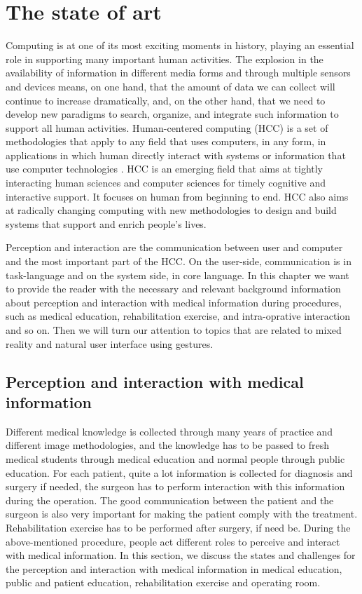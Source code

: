 
\chapter{The state of art} \label{sec:bg}
Computing is at one of its most exciting moments in history, playing an essential role in supporting many important human activities. The explosion in the availability of information in different media forms and through multiple sensors and devices means, on one hand, that the amount of data we can collect will continue to increase dramatically, and, on the other hand, that we need to develop new paradigms to search, organize, and integrate such information to support all human activities.
Human-centered computing (HCC) is a set of methodologies that apply to any field that uses computers, in any form, in applications in which human directly interact with systems or information that use computer technologies \cite{Jaimes2006f}.
HCC is an emerging field that aims at tightly interacting human sciences and computer sciences for timely cognitive and interactive support.
It focuses on human from beginning to end. HCC also aims at radically changing computing with new methodologies to design and build systems that support and enrich people's lives. 

Perception and interaction are the communication between user and computer and the most important part of the HCC. On the user-side, communication is in task-language and on the system side, in core language. 
In this chapter we want to provide the reader with the necessary and relevant background information about perception and interaction with medical information during procedures, such as medical education, rehabilitation exercise, and intra-oprative interaction and so on.
Then we will turn our attention to topics that are related to mixed reality and natural user interface using gestures. 

\section{Perception and interaction with medical information}
Different medical knowledge is collected through many years of practice and different image methodologies, and the knowledge has to be passed to fresh medical students through medical education and normal people through public education. For each patient, quite a lot information is collected for diagnosis and surgery if needed, the surgeon has to perform interaction with this information during the operation. The good communication between the patient and the surgeon is also very important for making the patient comply with the treatment. 
Rehabilitation exercise has to be performed after surgery, if need be.
During the above-mentioned procedure, people act different roles to perceive and interact with medical information. In this section, we discuss the states and challenges for the perception and interaction with medical information in medical education, public and patient education, rehabilitation exercise and operating room.

